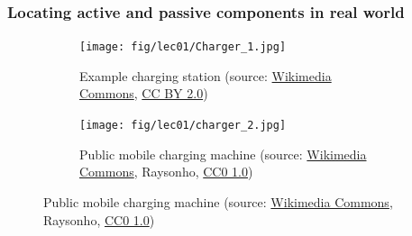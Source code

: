 \begin{frame}
	\frametitle{Locating active and passive components in real world}
	\begin{figure}
		\centering
		\begin{subfigure}[t]{0.4\textwidth}
			\centering
			\texttt{[image: fig/lec01/Charger\_1.jpg]}
			\caption{Example charging station (source: \href{https://commons.wikimedia.org/wiki/File:Nissan_LEAF_got_thirsty.jpg}{Wikimedia Commons}, \href{https://creativecommons.org/licenses/by-sa/3.0/deed.en}{CC BY 2.0})}
		\end{subfigure}
		\begin{subfigure}[t]{0.4\textwidth}
			\centering
			\texttt{[image: fig/lec01/charger\_2.jpg]}
			\caption{Public mobile charging machine (source: \href{https://commons.wikimedia.org/wiki/File:CellPhoneChargingStation.jpg}{Wikimedia Commons}, Raysonho, \href{https://creativecommons.org/publicdomain/zero/1.0/deed.ru}{CC0 1.0})}
		\end{subfigure}
	\end{figure}
\end{frame}


